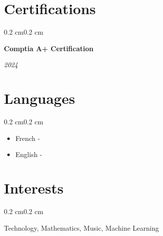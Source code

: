\documentclass[10pt, letterpaper]{article}
\newenvironment{highlights}{%
    \begin{itemize}[
        topsep=0.10 cm,%
        parsep=0.10 cm,%
        partopsep=0pt,%
        itemsep=0pt,%
        leftmargin=0.4 cm + 10pt%
    ]
}{%
    \end{itemize}%
}
\newenvironment{onecolentry}{%
    \begin{adjustwidth}{0.2 cm}{0.2 cm}%
}{%
    \end{adjustwidth}%
}
\newenvironment{twocolentry}[1]{%
    \begin{onecolentry}%
    \def\twocolentryarg{#1}%
    \noindent
    \begin{minipage}[t]{0.68\textwidth} %
}{%
    \end{minipage}\hfill%
    \begin{minipage}[t]{0.30\textwidth} %
      \raggedleft\twocolentryarg
    \end{minipage}%
    \vspace{0.2cm}%
    \end{onecolentry}%
}
\begin{document}
\section{Certifications}
\begin{twocolentry}{\textit{2024}}
    \textbf{Comptia A+ Certification }\\
    \textit{ }
\end{twocolentry}
\vspace{0.10 cm}

\section{Languages}
\begin{onecolentry}
    \begin{highlights}
        \item French - 
        \item English - 
    \end{highlights}
\end{onecolentry}

\section{Interests}
\begin{onecolentry}
    Technology, Mathematics, Music, Machine Learning
\end{onecolentry}
\end{document}
